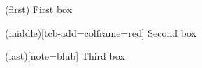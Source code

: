 \documentclass[a4paper, 11pt]{book}
\begin{document}
\begin{definition}(first)
    First box
\end{definition}
\begin{definition}(middle)[tcb-add={colframe=red}]
    Second box
\end{definition}
\begin{definition}(last)[note=blub]
    Third box
\end{definition}
\end{document}
